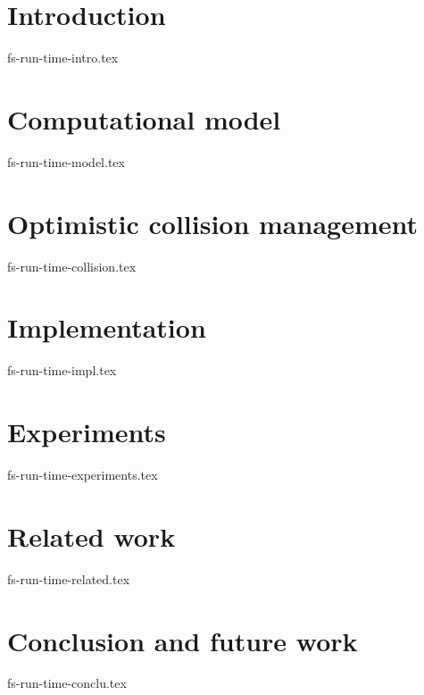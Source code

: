 \documentclass[sigconf]{acmart}
\theoremstyle{remark}
\begin{document}
\maketitle

\section {Introduction}
 {fs-run-time-intro.tex}

\section {Computational model}
 {fs-run-time-model.tex}

\section {Optimistic collision management}
 {fs-run-time-collision.tex}

\section {Implementation}
 {fs-run-time-impl.tex}

\section {Experiments}
 {fs-run-time-experiments.tex}

\section {Related work}
 {fs-run-time-related.tex}

\section {Conclusion and future work}
 {fs-run-time-conclu.tex}



\end{document}
